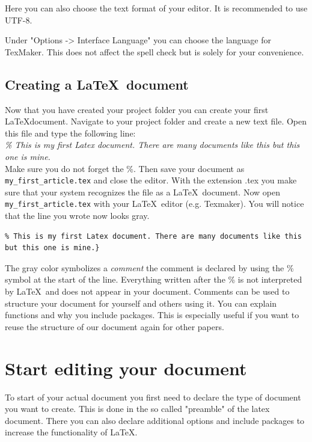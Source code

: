 \documentclass[]{tufte-book} %
\begin{document}
Here you can also choose the text format of your editor. It is recommended to use UTF-8.

Under "Options -> Interface Language" you can choose the language for TexMaker. This does not affect the spell check but is solely for your convenience.  


\section{Creating a \LaTeX\ document}

Now that you have created your project folder you can create your first \LaTeX document. Navigate to your project folder and create a new text file. Open this file and type the following line:\\[5pt]

\emph{\% This is my first Latex document. There are many documents like this but this one is mine.}\\[5pt]

Make sure you do not forget the \%. Then save your document as \verb!my_first_article.tex! and close the editor. With the extension .tex you make sure that your system recognizes the file as a \LaTeX\ document.
Now open \verb!my_first_article.tex! with your \LaTeX\ editor (e.g. Texmaker). You will notice that the line you wrote now looks gray.\\[5pt]

\begin{lstlisting}
% This is my first Latex document. There are many documents like this but this one is mine.}
\end{lstlisting}

The gray color symbolizes a \emph{comment} the comment is declared by using the \% symbol at the start of the line. Everything written after the \% is not interpreted by \LaTeX\ and does not appear in your document. Comments can be used to structure your document for yourself and others using it. You can explain functions and why you include packages. This is especially useful if you want to reuse the structure of our document again for other papers.    

\chapter{Start editing your document}

To start of your actual document you first need to declare the type of document you want to create. This is done in the so called "preamble" of the latex document. There you can also declare additional options and include packages to increase the functionality of \LaTeX.
\end{document}
